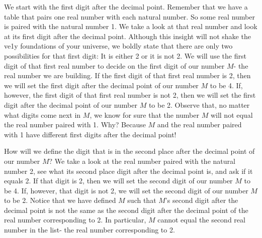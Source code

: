\ifsolns
We start with the first digit after the decimal point. Remember that we have a table that pairs one real number with each natural number. So some real number is paired with the natural number 1. We take a look at that real number and look at its first digit after the decimal point. Although this insight will not shake the ve1y foundations of your universe, we boldly state that there are only two possibilities for that first digit: It is either 2 or it is not 2. We will use the first digit of that first real number to decide on the first digit of our number $M$- the real number we are building. If the first digit of that first real number is 2, then we will set the first digit after the decimal point of our number $M$ to be 4. If, however, the first digit of that first real number is not 2, then we will set the first digit after the decimal point of our number $M$ to be 2. Observe that, no matter what digits come next in $M$, we know for sure that the number $M$ will not equal the real number paired with 1. Why? Because $M$ and the real number paired with 1 have different first digits after the decimal point!

How will we define the digit that is in the second place after the decimal point of our number $M$? We take a look at the real number paired with the natural number 2, see what its second place digit after the decimal point is, and ask if it equals 2. If that digit is 2, then we will set the second digit of our number $M$ to be 4. If, however, that digit is not 2, we will set the second digit of our number $M$ to be 2. Notice that we have defined $M$ such that $M$'s second digit after the decimal point is not the same as the second digit after the decimal point of the real number corresponding to 2. In particular, $M$ cannot equal the second real number in the list- the real number corresponding to 2.

